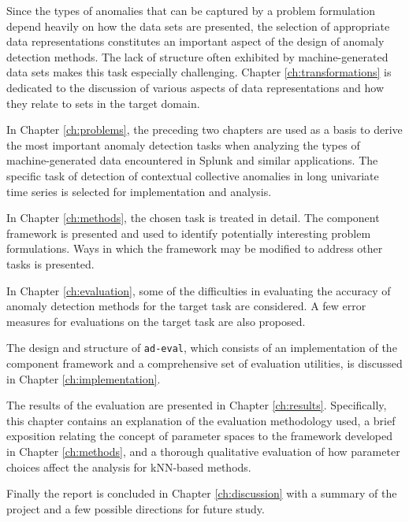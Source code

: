 Since the types of anomalies that can be captured by a problem formulation depend heavily on how the data sets are presented, the selection of appropriate data representations constitutes an important aspect of the design of anomaly detection methods. The lack of structure often exhibited by machine-generated data sets makes this task especially challenging. Chapter \ref{ch:transformations} is dedicated to the discussion of various aspects of data representations and how they relate to sets in the target domain. 

In Chapter \ref{ch:problems}, the preceding two chapters are used as a basis to derive the most important anomaly detection tasks when analyzing the types of machine-generated data encountered in Splunk and similar applications. The specific task of detection of contextual collective anomalies in long univariate time series is selected for implementation and analysis.

In Chapter \ref{ch:methods}, the chosen task is treated in detail. The component framework is presented and used to identify potentially interesting problem formulations. Ways in which the framework may be modified to address other tasks is presented.

In Chapter \ref{ch:evaluation}, some of the difficulties in evaluating the accuracy of anomaly detection methods for the target task are considered. A few error measures for evaluations on the target task are also proposed.

The design and structure of \texttt{ad-eval}, which consists of an implementation of the component framework and a comprehensive set of evaluation utilities, is discussed in Chapter \ref{ch:implementation}. 

The results of the evaluation are presented in Chapter \ref{ch:results}. Specifically, this chapter contains an explanation of the evaluation methodology used, a brief exposition relating the concept of parameter spaces to the framework developed in Chapter \ref{ch:methods}, and a thorough qualitative evaluation of how parameter choices affect the analysis for kNN-based methods. 

Finally the report is concluded in Chapter \ref{ch:discussion} with a summary of the project and a few possible directions for future study.
